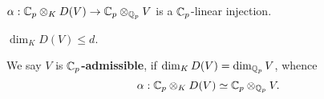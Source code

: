 \begin{proposition}
    $\alpha : \mathbb{C}_p\otimes_{K} D(V)\to\mathbb{C}_p\otimes_{\mathbb{Q}_p}V$ is a $\mathbb{C}_p$-linear injection.
\end{proposition}
\begin{corollary}
    $\dim_K D(V)\le d$.
\end{corollary}

We say $V$ is \textbf{$\mathbb{C}_p$-admissible},
if $\dim_K D(V) = \dim_{\mathbb{Q}_p} V$,
whence \[\alpha : \mathbb{C}_p\otimes_{K} D(V)\simeq\mathbb{C}_p\otimes_{\mathbb{Q}_p} V.\]

